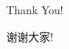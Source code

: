 \documentclass[10pt]{beamer}
\begin{document}










\begin{frame}
  \begin{center}
    \Large Thank You!

    \Large 谢谢大家!
\end{center}
\end{frame}
\end{document}
